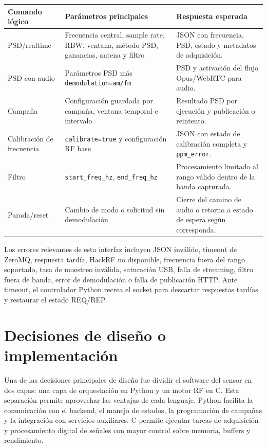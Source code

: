 \begin{longtable}{p{}p{}p{}}
\toprule
\textbf{Comando lógico} & \textbf{Parámetros principales} & \textbf{Respuesta esperada} \\
\midrule
\endhead
PSD/realtime & Frecuencia central, sample rate, RBW, ventana, método PSD, ganancias, antena y filtro & JSON con frecuencia, PSD, estado y metadatos de adquisición. \\
PSD con audio & Parámetros PSD más \texttt{demodulation=am/fm} & PSD y activación del flujo Opus/WebRTC para audio. \\
Campaña & Configuración guardada por campaña, ventana temporal e intervalo & Resultado PSD por ejecución y publicación o reintento. \\
Calibración de frecuencia & \texttt{calibrate=true} y configuración RF base & JSON con estado de calibración completa y \texttt{ppm\_error}. \\
Filtro & \texttt{start\_freq\_hz}, \texttt{end\_freq\_hz} & Procesamiento limitado al rango válido dentro de la banda capturada. \\
Parada/reset & Cambio de modo o solicitud sin demodulación & Cierre del camino de audio o retorno a estado de espera según corresponda. \\
\bottomrule
\end{longtable}

Los errores relevantes de esta interfaz incluyen JSON inválido, timeout de
ZeroMQ, respuesta tardía, HackRF no disponible, frecuencia fuera del rango
soportado, tasa de muestreo inválida, saturación USB, falla de streaming, filtro
fuera de banda, error de demodulación o falla de publicación HTTP. Ante timeout,
el controlador Python recrea el socket para descartar respuestas tardías y
restaurar el estado REQ/REP.


\section{Decisiones de diseño o implementación}

Una de las decisiones principales de diseño fue dividir el software del sensor en
dos capas: una capa de orquestación en Python y un motor RF en C. Esta separación
permite aprovechar las ventajas de cada lenguaje. Python facilita la comunicación
con el backend, el manejo de estados, la programación de campañas y la integración
con servicios auxiliares. C permite ejecutar tareas de adquisición y procesamiento
digital de señales con mayor control sobre memoria, buffers y rendimiento.

